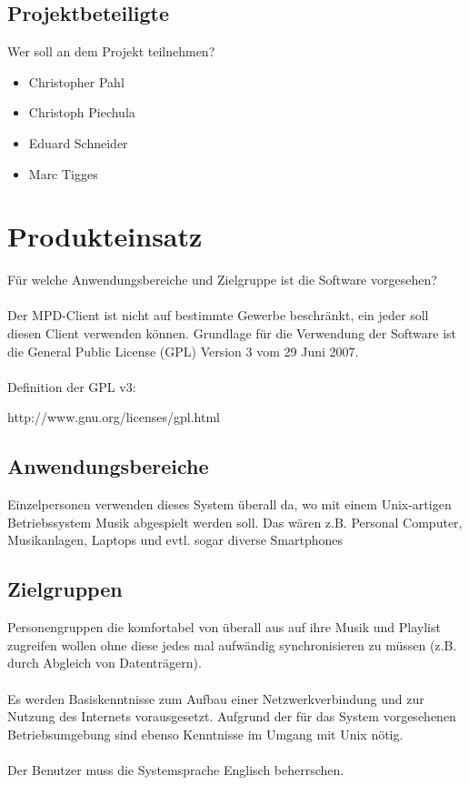 \subsection{Projektbeteiligte}
Wer soll an dem Projekt teilnehmen?
\begin{itemize}
	\item Christopher Pahl
	\item Christoph Piechula
	\item Eduard Schneider
	\item Marc Tigges
\end{itemize}
\section{Produkteinsatz}
Für welche Anwendungsbereiche und Zielgruppe ist die Software vorgesehen?\ \\ \\
Der MPD-Client ist nicht auf bestimmte Gewerbe beschränkt, ein jeder soll diesen
Client verwenden können. Grundlage für die Verwendung der Software ist die General
Public License (GPL) Version 3 vom 29 Juni 2007.\ \\ \\
Definition der GPL v3:
\begin{center}
	http://www.gnu.org/licenses/gpl.html
\end{center}
\subsection{Anwendungsbereiche}
Einzelpersonen verwenden dieses System überall da, wo mit
einem Unix-artigen Betriebssystem Musik abgespielt werden soll.
Das wären z.B. Personal Computer, Musikanlagen, Laptops und evtl.
sogar diverse Smartphones
\subsection{Zielgruppen}
Personengruppen die komfortabel von überall aus auf ihre Musik und Playlist zugreifen
wollen ohne diese jedes mal aufwändig synchronisieren zu müssen (z.B. durch Abgleich von Datenträgern).\ \\ \\
Es werden Basiskenntnisse zum Aufbau einer Netzwerkverbindung und zur Nutzung des Internets vorausgesetzt.
Aufgrund der für das System vorgesehenen Betriebsumgebung sind ebenso Kenntnisse im Umgang mit Unix nötig.\ \\ \\
Der Benutzer muss die Systemsprache Englisch beherrschen.
